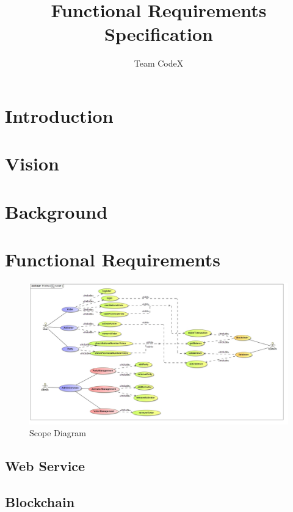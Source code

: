 \documentclass[11pt]{article}
\author{Team CodeX}
\title{Functional Requirements Specification}
\begin{document}
	\setlength{\parskip}{6pt}
	
	
	
	\tableofcontents
	\newpage
	
	\listoffigures
	\newpage
	
	\section{Introduction}
		
	
	\section{Vision}
		
	
	\section{Background}
		
		\newpage
		
	\section{Functional Requirements}
	\begin{figure}[H]
		\centering
		\includegraphics[width=\linewidth]{../Images/System/Scope.jpg}
		\caption{Scope Diagram}
	\end{figure}
	
	\newpage

	\subsection{Web Service}
		
		
	\subsection{Blockchain}
		
		
\end{document}
